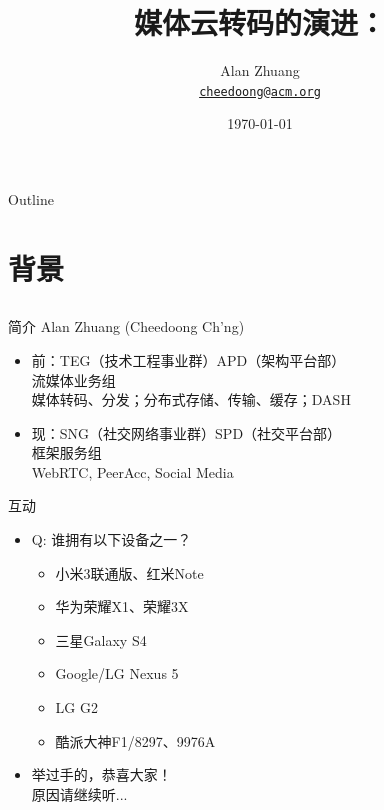 \documentclass{beamer}
\title{媒体云转码的演进：\\\Small{MapReduce、DASH与稳定婚姻}}
\author{Alan Zhuang\\
\href{mailto:cheedoong@acm.org}{\nolinkurl{cheedoong@acm.org}}\\
}
\date{\today}
\begin{document}

\frame{\titlepage}

\section[Outline]{}
\begin{frame}{Outline}
\tableofcontents
\end{frame}

\section{背景}
\subsection{}
\begin{frame}{简介}
Alan Zhuang (Cheedoong Ch'ng) \pause
\begin{itemize}
\item  前：TEG（技术工程事业群）APD（架构平台部）\\ 流媒体业务组\\
媒体转码、分发；分布式存储、传输、缓存；DASH
\item  现：SNG（社交网络事业群）SPD（社交平台部）\\ 框架服务组\\
WebRTC, PeerAcc, Social  Media
\end{itemize}
\end{frame}
\begin{frame}{互动}
\begin{itemize}
\item Q: 谁拥有以下设备之一？
	\begin{itemize}
	\item 小米3联通版、红米Note
	\item 华为荣耀X1、荣耀3X
	\item 三星Galaxy S4
	\item Google/LG Nexus 5
	\item LG G2
	\item 酷派大神F1/8297、9976A
	\end{itemize}
\item  举过手的，恭喜大家！\\
原因请继续听...
\end{itemize}
\end{frame}
\end{document}
